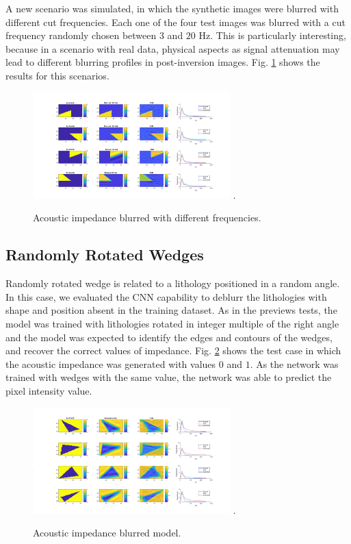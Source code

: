 \documentclass[conference,compsoc]{IEEEtran}
\begin{document}
A new scenario was simulated, in which the  synthetic images were blurred with different
cut frequencies. Each one of the four test images was blurred with a cut frequency
randomly chosen between $3$ and $20$ Hz. This is particularly interesting, because
in a scenario with real data, physical aspects as signal attenuation may lead to
different blurring profiles in post-inversion images.
Fig. \ref{fig_scenario5} shows the results for this scenarios.
\begin{figure}[!t]
\centering
\includegraphics[width=3.0in]{Figs/Caso5}
\DeclareGraphicsExtensions.
\caption{Acoustic impedance blurred with different frequencies.}
\label{fig_scenario5}
\end{figure}

\subsection{Randomly Rotated Wedges}
Randomly rotated wedge is related to a lithology positioned in a random angle.
In this case, we evaluated the CNN capability to deblurr the lithologies with shape and position absent
in the training dataset. As in the previews tests, the model was trained with lithologies rotated
in integer multiple of the right angle and the model was expected to identify the edges and contours of the wedges,
and recover the correct values of impedance.
Fig. \ref{fig_scenario4} shows the test case in which the acoustic impedance was generated with values $0$ and $1$.
As the network was trained with wedges with the same value, the network was able to predict
the pixel intensity value.
\begin{figure}[!t]
\centering
\includegraphics[width=3.0in]{Figs/Caso4}
\DeclareGraphicsExtensions.
\caption{Acoustic impedance blurred model.}
\label{fig_scenario4}
\end{figure}
\end{document}
